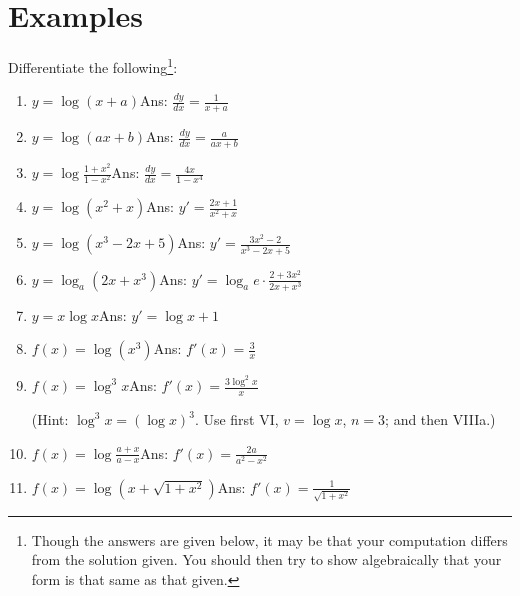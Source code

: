 \section{Examples}

Differentiate the following\footnote{Though the answers are given 
below, it may be that your computation differs from the solution given.
You should then try to show algebraically that your form is that same 
as that given.}: %

\begin{enumerate}

\item
$y = \log(x + a)$\qquad\qquad\qquad\qquad\qquad\qquad Ans: 	$\frac{dy}{dx} = \frac{1}{x + a}$

\item
$y = \log(ax + b)$\qquad\qquad\qquad\qquad\qquad\qquad Ans: 	$\frac{dy}{dx} = \frac{a}{ax + b}$

\item
$y = \log \frac{1 + x^2}{1 - x^2}$\qquad\qquad\qquad\qquad\qquad\qquad Ans: 	$\frac{dy}{dx} = \frac{4x}{1 - x^4}$

\item
$y = \log(x^2 + x)$\qquad\qquad\qquad\qquad\qquad\qquad Ans: 	$y' = \frac{2x + 1}{x^2 + x}$

\item
$y = \log(x^3 - 2x + 5)$\qquad\qquad\qquad\qquad\qquad\qquad Ans: 	$y' = \frac{3x^2 - 2}{x^3 - 2x + 5}$

\item
$y = \log_a(2x + x^3)$\qquad\qquad\qquad\qquad\qquad\qquad Ans: 	$y' = \log_a e \cdot \frac{2 + 3x^2}{2x + x^3}$

\item
$y = x\log x$\qquad\qquad\qquad\qquad\qquad\qquad Ans: 	$y' = \log x + 1$

\item
$f(x) = \log (x^3)$\qquad\qquad\qquad\qquad\qquad\qquad Ans: 	$f'(x) = \frac{3}{x}$

\item
$f(x) = \log^3 x$\qquad\qquad\qquad\qquad\qquad\qquad Ans: 	$f'(x) = \frac{3 \log^2 x}{x}$

(Hint: $\log^3x = (\log x)^3$. Use first VI, $v = \log x$, $n = 3$; and then VIIIa.)

\item
$f(x) = \log \frac{a + x}{a - x}$\qquad\qquad\qquad\qquad\qquad\qquad Ans: 	$f'(x) = \frac{2a}{a^2 - x^2}$

\item
$f(x) = \log (x + \sqrt{1 + x^2})$\qquad\qquad\qquad\qquad\qquad\qquad Ans: 	$f'(x) = \frac{1}{\sqrt{1 + x^2}}$


\end{enumerate}
